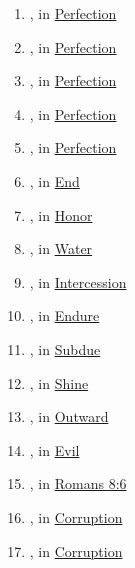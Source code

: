 \begin{enumerate}
		\item \hyperref[TELEIOS]{}, in \hyperref[PERFECTION]{Perfection}
		
		\item \hyperref[TELEIOTES]{}, in \hyperref[PERFECTION]{Perfection}
		
		\item \hyperref[TELEIOO]{}, in \hyperref[PERFECTION]{Perfection}
		
		\item \hyperref[TELEIOSIS]{}, in \hyperref[PERFECTION]{Perfection}
		
		\item \hyperref[TELEIOTES-2]{}, in \hyperref[PERFECTION]{Perfection}
		
		\item \hyperref[TELOS]{}, in \hyperref[END]{End}
		
		\item \hyperref[TIME-2]{}, in \hyperref[HONOR]{Honor}
		
		\item \hyperref[HUDOR]{}, in \hyperref[WATER]{Water}
		
		\item \hyperref[HUPERENTUNCHANO]{}, in \hyperref[INTERCESSION]{Intercession}
		
		\item \hyperref[HUPOMENO]{}, in \hyperref[ENDURE]{Endure}
		
		\item \hyperref[HUPOTASSO]{}, in \hyperref[SUBDUE]{Subdue}
		
		\item \hyperref[PHAINO]{}, in \hyperref[SHINE]{Shine}
		
		\item \hyperref[PHANEROS]{}, in \hyperref[OUTWARD]{Outward}
		
		\item \hyperref[PHAULOS]{}, in \hyperref[EVIL]{Evil}
		
		\item \hyperref[PHRONEMA]{}, in \hyperref[ROMANS-8-6]{Romans 8:6}
		
		\item \hyperref[PHTHARTOS]{}, in \hyperref[CORRUPTION]{Corruption}
		
		\item \hyperref[PHTHORA]{}, in \hyperref[CORRUPTION]{Corruption}
		

\end{enumerate}
